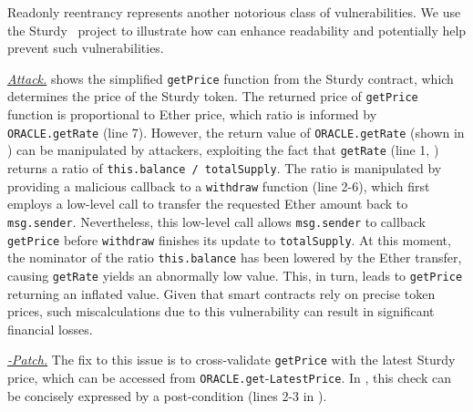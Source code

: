 Readonly reentrancy represents another notorious class of vulnerabilities.
We use the Sturdy~\cite{sturdy} project 
to illustrate how \lang can enhance readability and potentially help prevent such vulnerabilities. %

\smallskip \noindent \underline{\textit{Attack.}}
 shows the simplified \texttt{getPrice} function from the Sturdy contract, 
which determines the price of the Sturdy token. 
The returned price of \texttt{getPrice} function is proportional to Ether price,
which ratio is informed by \texttt{ORACLE.getRate} (line 7).
However, the return value of \texttt{ORACLE.getRate} (shown in ) can be manipulated by attackers,
exploiting the fact that \texttt{getRate} (line 1, ) returns a ratio of \texttt{this.balance / totalSupply}. 
The ratio is manipulated by providing a malicious callback to a \texttt{withdraw} function (line 2-6),
which first employs a low-level call to transfer the requested Ether amount back to \texttt{msg.sender}.
Nevertheless, this low-level call allows \texttt{msg.sender} to callback \texttt{getPrice} 
before \texttt{withdraw} finishes its update to \texttt{totalSupply}.
At this moment, the nominator of the ratio \texttt{this.balance} has been lowered by the Ether transfer,
causing \texttt{getRate} yields an abnormally low value.
This, in turn, leads to \texttt{getPrice} returning an inflated value.
Given that smart contracts rely on precise token prices, such miscalculations 
due to this vulnerability can result in significant financial losses. 

\smallskip
\noindent \underline{\textit{\lang-Patch.}}
The fix to this issue is to cross-validate 
\texttt{getPrice} with the latest Sturdy price, which can be accessed 
from \texttt{ORACLE.get}-\texttt{LatestPrice}. 
In \lang, this check can be concisely expressed by a post-condition (lines 2-3 in ).


